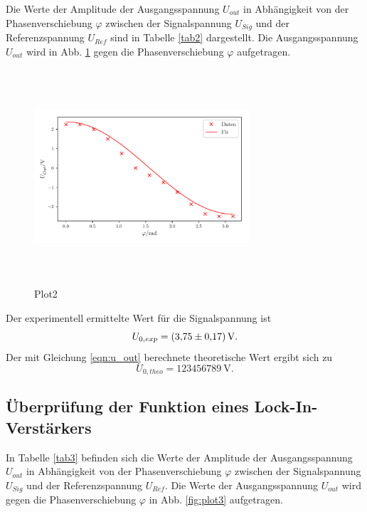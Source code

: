 \noindent Die Werte der Amplitude der Ausgangsspannung $U_{out}$ in Abhängigkeit von der Phasenverschiebung $\varphi$
zwischen der Signalspannung $U_{Sig}$ und der Referenzspannung $U_{Ref}$
sind in Tabelle \ref{tab2} dargestellt. Die Ausgangsspannung $U_{out}$ wird in Abb. \ref{fig:plot2} gegen die Phasenverschiebung $\varphi$
aufgetragen.


\begin{figure}
    \centering
    \includegraphics[width=8cm, height=8cm]{build/plot2.pdf}
    \caption{Plot2}
    \label{fig:plot2}
\end{figure}

\noindent Der experimentell ermittelte Wert für die Signalspannung ist
\begin{equation*}
    U_{0,exp} = \SI{3.75 \pm 0.17}{\volt}.
\end{equation*}
Der mit Gleichung \eqref{eqn:u_out} berechnete theoretische Wert ergibt sich zu
\begin{equation*}
    U_{0,theo} = \SI{123456789}{\volt}. %
\end{equation*}

\subsection{Überprüfung der Funktion eines Lock-In-Verstärkers}
In Tabelle \ref{tab3} befinden sich die Werte der Amplitude der Ausgangsspannung $U_{out}$ in
Abhängigkeit von der Phasenverschiebung $\varphi$ zwischen der Signalspannung $U_{Sig}$ und
der Referenzspannung $U_{Ref}$. Die Werte der Ausgangsspannung $U_{out}$ wird gegen die Phasenverschiebung $\varphi$
in Abb. \ref{fig:plot3} aufgetragen.


